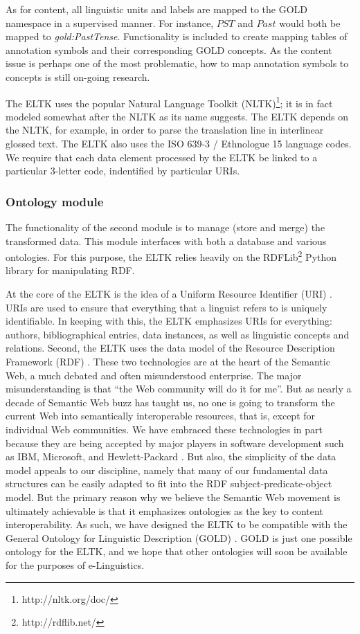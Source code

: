 \documentclass[]{article}
\begin{document}
As for content, all linguistic units and labels are mapped to the GOLD \cite{FarrarLangendoen2003} namespace in a supervised manner. For instance, $PST$ and $Past$ would both be mapped to \textit{gold:PastTense}. Functionality is included to create mapping tables of annotation symbols and their corresponding GOLD concepts. As the content issue is perhaps one of the most problematic, how to map annotation symbols to concepts is still on-going research.

The ELTK uses the popular Natural Language Toolkit (NLTK)\footnote{http://nltk.org/doc/}; it is in fact modeled somewhat after the NLTK as its name suggests. The ELTK depends on the NLTK, for example, in order to parse the translation line in interlinear glossed text. The ELTK also uses the ISO 639-3 / Ethnologue 15 language codes. We require that each data element processed by the ELTK be linked to a particular 3-letter code, indentified by particular URIs. 

\subsubsection{Ontology module}

The functionality of the second module is to manage (store and merge) the transformed data. This module interfaces with both a database and various ontologies. For this purpose, the ELTK relies heavily on the RDFLib\footnote{http://rdflib.net/} Python library for manipulating RDF. 

At the core of the ELTK is the idea of a Uniform Resource Identifier (URI) \cite{Berners-LeeFieldingMasinter1998}. URIs are used to ensure that everything that a linguist refers to is uniquely identifiable. In keeping with this, the ELTK emphasizes URIs for everything: authors, bibliographical entries, data instances, as well as linguistic concepts and relations. Second, the ELTK uses the data model of the Resource Description Framework (RDF) \cite{LassilaSwick1999}. These two technologies are at the heart of the Semantic Web, a much debated and often misunderstood enterprise. The major misunderstanding is that ``the Web community will do it for me''. But as nearly a decade of Semantic Web buzz has taught us, no one is going to transform the current Web into semantically interoperable resources, that is, except for individual Web communities. We have embraced these technologies in part because they are being accepted by major players in software development such as IBM, Microsoft, and Hewlett-Packard \cite{HP2003}. But also, the simplicity of the data model appeals to our discipline, namely that many of our fundamental data structures can be easily adapted to fit into the RDF subject-predicate-object model. But the primary reason why we believe the Semantic Web movement is ultimately achievable is that it emphasizes ontologies as the key to content interoperability. As such, we have designed the ELTK to be compatible with the General Ontology for Linguistic Description (GOLD) \cite{FarrarLangendoen2003}. GOLD is just one possible ontology for the ELTK, and we hope that other ontologies will soon be available for the purposes of e-Linguistics.
\end{document}

